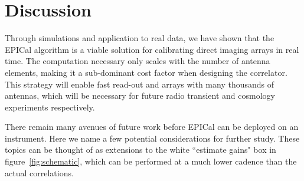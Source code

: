 \documentclass[a4paper,fleqn,usenatbib]{../mnras}
\newcommand{\damp}{\ensuremath{\gamma}}
\begin{document}
%
%
%
%



\section{Discussion}\label{sec:discussion}
Through simulations and application to real data, we have shown that the EPICal algorithm is a viable solution for calibrating direct imaging arrays in real time. The computation necessary only scales with the number of antenna elements, making it a sub-dominant cost factor when designing the correlator. This strategy will enable fast read-out and arrays with many thousands of antennas, which will be necessary for future radio transient and cosmology experiments respectively.

There remain many avenues of future work before EPICal can be deployed on an instrument. Here we name a few potential considerations for further study. These topics can be thought of as extensions to the white ``estimate gains" box in figure~\ref{fig:schematic}, which can be performed at a much lower cadence than the actual correlations.
\end{document}
